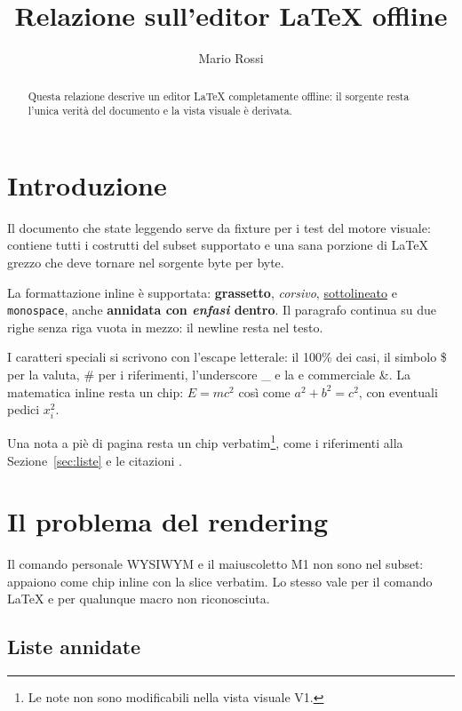 \documentclass[a4paper,11pt]{article}
\title{Relazione sull'editor \LaTeX{} offline}
\author{Mario Rossi}
\date{\datarelazione}
\newcommand{\sigla}[1]{\textsc{#1}}
\begin{document}
\maketitle

\begin{abstract}
Questa relazione descrive un editor \LaTeX{} completamente offline: il
sorgente resta l'unica verità del documento e la vista visuale è derivata.
\end{abstract}

\section{Introduzione}

\label{sec:intro}

Il documento che state leggendo serve da fixture per i test del motore
visuale: contiene tutti i costrutti del subset supportato e una sana
porzione di LaTeX grezzo che deve tornare nel sorgente byte per byte.

La formattazione inline è supportata: \textbf{grassetto}, \emph{corsivo},
\underline{sottolineato} e \texttt{monospace}, anche \textbf{annidata con
\emph{enfasi} dentro}. Il paragrafo continua su due righe %
senza riga vuota in mezzo: il newline resta nel testo.

I caratteri speciali si scrivono con l'escape letterale: il 100\% dei casi,
il simbolo \$ per la valuta, \# per i riferimenti, l'underscore \_ e la
e commerciale \&. La matematica inline resta un chip: $E = mc^2$ così come
\(a^2 + b^2 = c^2\), con eventuali pedici $x_i^2$.

Una nota a piè di pagina resta un chip verbatim\footnote{Le note non sono
modificabili nella vista visuale V1.}, come i riferimenti alla
Sezione~\ref{sec:liste} e le citazioni \cite{knuth1984}.


\section{Il \textbf{problema} del rendering}

Il comando personale \sigla{WYSIWYM} e il maiuscoletto \textsc{M1} non sono
nel subset: appaiono come chip inline con la slice verbatim. Lo stesso vale
per il comando \LaTeX{} e per qualunque macro non riconosciuta.

\subsection{Liste annidate}
\end{document}
